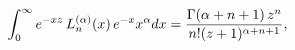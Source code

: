 \[\int_{0}^{\infty}e^{-xz}\mathop{L^{(\alpha)}_{n}\/}\nolimits\!\left(x\right)e^%
{-x}x^{\alpha}dx=\frac{\mathop{\Gamma\/}\nolimits\!\left(\alpha+n+1\right)z^{n%
}}{n!(z+1)^{\alpha+n+1}},\]